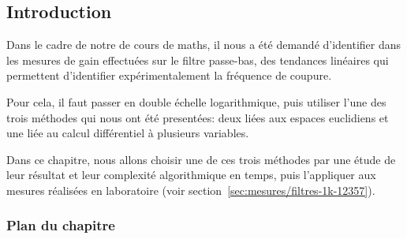 \subsection*{Introduction}

Dans le cadre de notre de cours de maths,
il nous a été demandé d'identifier dans les mesures de gain effectuées
sur le filtre passe-bas,
des tendances linéaires qui permettent d'identifier expérimentalement
la fréquence de coupure.

Pour cela, il faut passer en double échelle logarithmique,
puis utiliser l'une des trois méthodes qui nous ont été presentées:
deux liées aux espaces euclidiens et une liée au calcul différentiel
à plusieurs variables.

Dans ce chapitre, nous allons choisir une de ces trois méthodes
par une étude de leur résultat et leur complexité algorithmique en temps,
puis l'appliquer aux mesures réalisées en laboratoire
(voir section~\ref{sec:mesures/filtres-1k-12357}).

\subsubsection*{Plan du chapitre}
